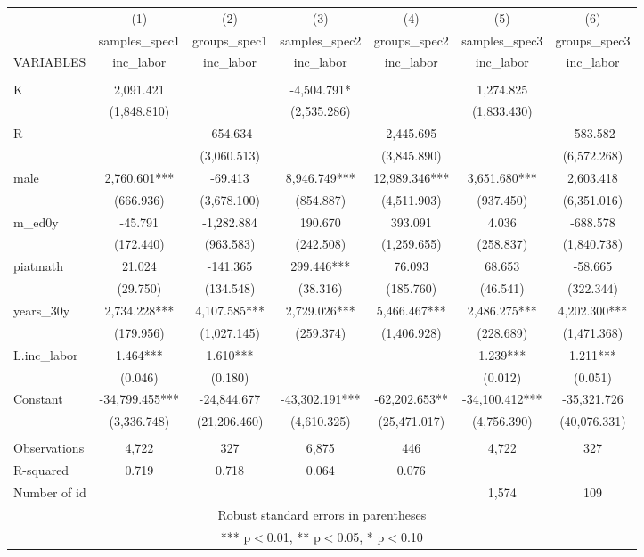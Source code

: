 \begin{tabular}{lcccccc} \hline
 & (1) & (2) & (3) & (4) & (5) & (6) \\
 & samples\_spec1 & groups\_spec1 & samples\_spec2 & groups\_spec2 & samples\_spec3 & groups\_spec3 \\
VARIABLES & inc\_labor & inc\_labor & inc\_labor & inc\_labor & inc\_labor & inc\_labor \\ \hline
 &  &  &  &  &  &  \\
K & 2,091.421 &  & -4,504.791* &  & 1,274.825 &  \\
 & (1,848.810) &  & (2,535.286) &  & (1,833.430) &  \\
R &  & -654.634 &  & 2,445.695 &  & -583.582 \\
 &  & (3,060.513) &  & (3,845.890) &  & (6,572.268) \\
male & 2,760.601*** & -69.413 & 8,946.749*** & 12,989.346*** & 3,651.680*** & 2,603.418 \\
 & (666.936) & (3,678.100) & (854.887) & (4,511.903) & (937.450) & (6,351.016) \\
m\_ed0y & -45.791 & -1,282.884 & 190.670 & 393.091 & 4.036 & -688.578 \\
 & (172.440) & (963.583) & (242.508) & (1,259.655) & (258.837) & (1,840.738) \\
piatmath & 21.024 & -141.365 & 299.446*** & 76.093 & 68.653 & -58.665 \\
 & (29.750) & (134.548) & (38.316) & (185.760) & (46.541) & (322.344) \\
years\_30y & 2,734.228*** & 4,107.585*** & 2,729.026*** & 5,466.467*** & 2,486.275*** & 4,202.300*** \\
 & (179.956) & (1,027.145) & (259.374) & (1,406.928) & (228.689) & (1,471.368) \\
L.inc\_labor & 1.464*** & 1.610*** &  &  & 1.239*** & 1.211*** \\
 & (0.046) & (0.180) &  &  & (0.012) & (0.051) \\
Constant & -34,799.455*** & -24,844.677 & -43,302.191*** & -62,202.653** & -34,100.412*** & -35,321.726 \\
 & (3,336.748) & (21,206.460) & (4,610.325) & (25,471.017) & (4,756.390) & (40,076.331) \\
 &  &  &  &  &  &  \\
Observations & 4,722 & 327 & 6,875 & 446 & 4,722 & 327 \\
R-squared & 0.719 & 0.718 & 0.064 & 0.076 &  &  \\
 Number of id &  &  &  &  & 1,574 & 109 \\ \hline
\multicolumn{7}{c}{ Robust standard errors in parentheses} \\
\multicolumn{7}{c}{ *** p$<$0.01, ** p$<$0.05, * p$<$0.10} \\
\end{tabular}
